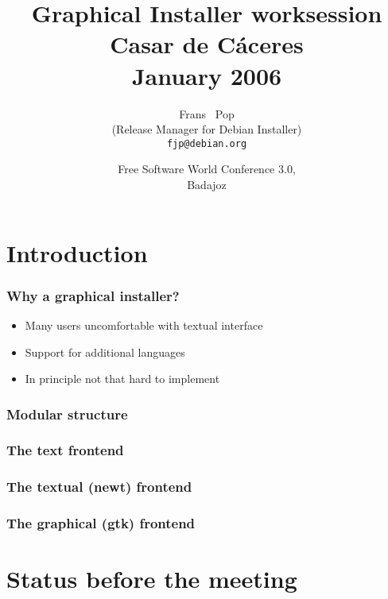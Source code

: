 \documentclass{beamer}
\title[Extremadura worksessions - Graphical Installer] %
{Graphical Installer worksession\\Casar de C\'{a}ceres\\January 2006}
\author[Frans Pop] %
{Frans ~Pop \\ (Release Manager for Debian Installer) \\ \texttt{fjp@debian.org}}
\date[FSWC 3.0, 2007] %
{Free Software World Conference 3.0,\\Badajoz}
\begin{document}
\begin{frame}
  \titlepage
\end{frame}

\begin{frame}
  \tableofcontents
\end{frame}


\section{Introduction}

\begin{frame}
  \frametitle{Why a graphical installer?}
	\begin{itemize}
	\item
		Many users uncomfortable with textual interface
	\item
		Support for additional languages
	\item
		In principle not that hard to implement
	\end{itemize}
\end{frame}

\begin{frame}[plain]
  \frametitle{Modular structure}
\end{frame}

\begin{frame}[plain]
  \frametitle{The text frontend}
\end{frame}

\begin{frame}[plain]
  \frametitle{The textual (newt) frontend}
\end{frame}

\begin{frame}[plain]
  \frametitle{The graphical (gtk) frontend}
\end{frame}

\section{Status before the meeting}
\end{document}
